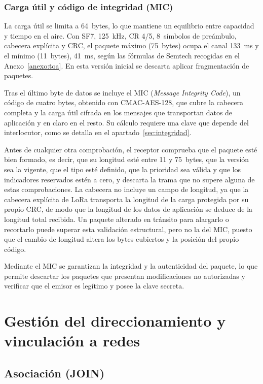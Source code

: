 \subsubsection{Carga útil y código de integridad (MIC)}

La carga útil se limita a 64~bytes, lo que mantiene un equilibrio entre capacidad y tiempo en el aire. Con SF7, 125~kHz, CR 4/5, 8~símbolos de preámbulo, cabecera explícita y CRC, el paquete máximo (75~bytes) ocupa el canal 133~ms y el mínimo (11~bytes), 41~ms, según las fórmulas de Semtech recogidas en el Anexo~\ref{anexo:toa}. En esta versión inicial se descarta aplicar fragmentación de paquetes.

Tras el último byte de datos se incluye el MIC (\emph{Message Integrity Code}), un código de cuatro bytes, obtenido con CMAC-AES-128\cite{rfc4493}, que cubre la cabecera completa y la carga útil cifrada en los mensajes que transportan datos de aplicación y en claro en el resto. Su cálculo requiere una clave que depende del interlocutor, como se detalla en el apartado~\ref{sec:integridad}.

Antes de cualquier otra comprobación, el receptor comprueba que el paquete esté bien formado, es decir, que su longitud esté entre 11 y 75~bytes, que la versión sea la vigente, que el tipo esté definido, que la prioridad sea válida y que los indicadores reservados estén a cero, y descarta la trama que no supere alguna de estas comprobaciones. La cabecera no incluye un campo de longitud, ya que la cabecera explícita de LoRa transporta la longitud de la carga protegida por su propio CRC, de modo que la longitud de los datos de aplicación se deduce de la longitud total recibida. Un paquete alterado en tránsito para alargarlo o recortarlo puede superar esta validación estructural, pero no la del MIC, puesto que el cambio de longitud altera los bytes cubiertos y la posición del propio código. 

Mediante el MIC se garantizan la integridad y la autenticidad del paquete, lo que permite descartar los paquetes que presentan modificaciones no autorizadas y verificar que el emisor es legítimo y posee la clave secreta.
\section{Gestión del direccionamiento y vinculación a redes}\label{sec:join}


\subsection{Asociación (JOIN)}

